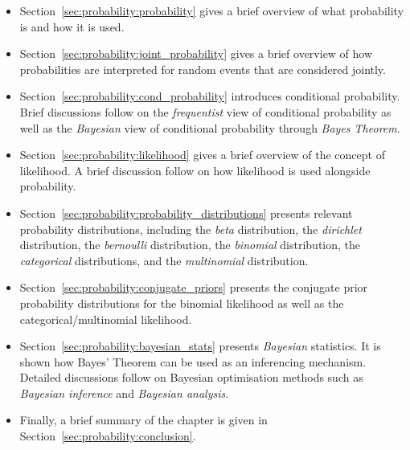 \begin{itemize}
    \item
    Section~\ref{sec:probability:probability} gives a brief overview of what
    probability is and how it is used.
    
    \item
    Section~\ref{sec:probability:joint_probability} gives a brief overview of
    how probabilities are interpreted for random events that are considered
    jointly.

    \item
    Section~\ref{sec:probability:cond_probability} introduces conditional
    probability. Brief discussions follow on the \textit{frequentist} view
    of conditional probability as well as the \textit{Bayesian} view of
    conditional probability through \textit{Bayes Theorem}.

    \item
    Section~\ref{sec:probability:likelihood} gives a brief overview of the
    concept of likelihood. A brief discussion follow on how likelihood is used
    alongside probability.

    \item
    Section~\ref{sec:probability:probability_distributions} presents relevant
    probability distributions, including the \textit{beta} distribution, the \textit{dirichlet} distribution, the \textit{bernoulli} distribution, the \textit{binomial} distribution, the \textit{categorical} distributions, and the \textit{multinomial} distribution.

    \item
    Section~\ref{sec:probability:conjugate_priors} presents the conjugate prior
    probability distributions for the binomial
    likelihood as well as the categorical/multinomial likelihood.

    \item
    Section~\ref{sec:probability:bayesian_stats} presents \textit{Bayesian}
    statistics. It is shown how Bayes' Theorem can be used as an inferencing
    mechanism. Detailed discussions follow on Bayesian optimisation methods such as \textit{Bayesian inference} and \textit{Bayesian analysis}.

    \item
    Finally, a brief summary of the chapter is given in
    Section~\ref{sec:probability:conclusion}.
\end{itemize}

